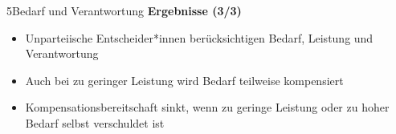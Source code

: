 \documentclass[xcolor=table,9pt,aspectratio=169]{beamer}
\begin{document}
\begin{frame}{\vspace*{10mm}5\hspace*{1em}Bedarf und Verantwortung}
\textbf{Ergebnisse (3/3)}\\
\medskip
\begin{itemize}
   \item Unparteiische Entscheider*innen berücksichtigen Bedarf, Leistung und Verantwortung
   \item Auch bei zu geringer Leistung wird Bedarf teilweise kompensiert
   \item Kompensationsbereitschaft sinkt, wenn zu geringe Leistung oder zu hoher Bedarf selbst verschuldet ist
\end{itemize}
\end{frame}
\end{document}
